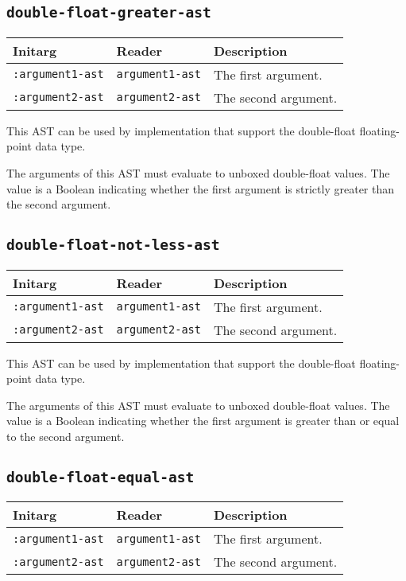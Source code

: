 \subsection{\texttt{double-float-greater-ast}}
\label{sec-ast-double-float-greater}

\begin{tabular}{|l|l|l|}
\hline
Initarg & Reader & Description\\
\hline\hline
\texttt{:argument1-ast} & \texttt{argument1-ast} & The first argument.\\
\hline
\texttt{:argument2-ast} & \texttt{argument2-ast} & The second argument.\\
\hline
\end{tabular}

This AST can be used by implementation that support the double-float
floating-point data type.  

The arguments of this AST must evaluate to unboxed double-float
values.  The value is a Boolean indicating whether the first argument
is strictly greater than the second argument.

\subsection{\texttt{double-float-not-less-ast}}
\label{sec-ast-double-float-not-less}

\begin{tabular}{|l|l|l|}
\hline
Initarg & Reader & Description\\
\hline\hline
\texttt{:argument1-ast} & \texttt{argument1-ast} & The first argument.\\
\hline
\texttt{:argument2-ast} & \texttt{argument2-ast} & The second argument.\\
\hline
\end{tabular}

This AST can be used by implementation that support the double-float
floating-point data type.  

The arguments of this AST must evaluate to unboxed double-float
values.  The value is a Boolean indicating whether the first argument
is greater than or equal to the second argument.

\subsection{\texttt{double-float-equal-ast}}
\label{sec-ast-double-float-equal}

\begin{tabular}{|l|l|l|}
\hline
Initarg & Reader & Description\\
\hline\hline
\texttt{:argument1-ast} & \texttt{argument1-ast} & The first argument.\\
\hline
\texttt{:argument2-ast} & \texttt{argument2-ast} & The second argument.\\
\hline
\end{tabular}

